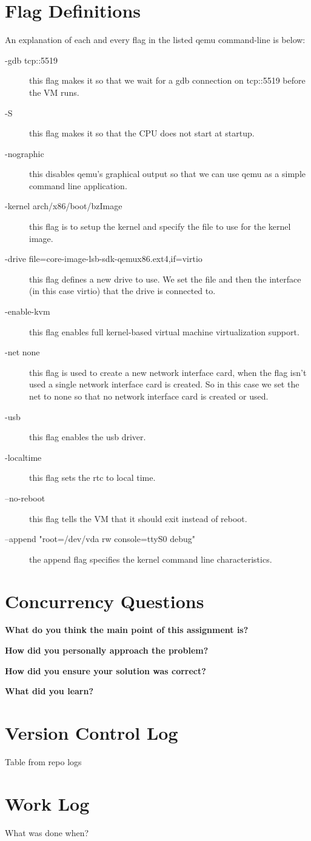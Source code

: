 \documentclass[10pt,letterpaper,draftclsnofoot,onecolumn]{IEEEtran}
\begin{document}
\section{Flag Definitions}
\noindent An explanation of each and every flag in the listed qemu command-line is below:
\begin{description}
\item [-gdb tcp::5519] this flag makes it so that we wait for a gdb connection on tcp::5519 before the VM runs.
\item [-S] this flag makes it so that the CPU does not start at startup.
\item [-nographic] this disables qemu's graphical output so that we can use qemu as a simple command line application.
\item [-kernel arch/x86/boot/bzImage] this flag is to setup the kernel and specify the file to use for the kernel image.
\item [-drive file=core-image-lsb-sdk-qemux86.ext4,if=virtio] this flag defines a new drive to use. We set the file and then the interface (in this case virtio) that the drive is connected to.
\item [-enable-kvm] this flag enables full kernel-based virtual machine virtualization support.
\item [-net none] this flag is used to create a new network interface card, when the flag isn’t used a single network interface card is created. So in this case we set the net to none so that no network interface card is created or used.
\item [-usb] this flag enables the usb driver.
\item [-localtime] this flag sets the rtc to local time.
\item [--no-reboot] this flag tells the VM that it should exit instead of reboot.
\item [--append "root=/dev/vda rw console=ttyS0 debug"] the append flag specifies the kernel command line characteristics.
\end{description}

\section{Concurrency Questions}
\noindent\textbf{What do you think the main point of this assignment is?}

\noindent\textbf{How did you personally approach the problem?}

\noindent\textbf{How did you ensure your solution was correct?}

\noindent\textbf{What did you learn?}

\section{Version Control Log}
\noindent Table from repo logs

\section{Work Log}
\noindent What was done when?
\end{document}
